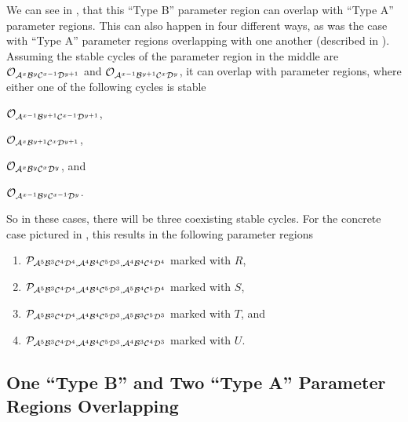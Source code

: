 We can see in , that this ``Type B'' parameter region can overlap with ``Type A'' parameter regions.
This can also happen in four different ways, as was the case with ``Type A'' parameter regions overlapping with one another (described in ).
Assuming the stable cycles of the parameter region in the middle are $\Cycle{\A^x\B^y\C^{x-1}\D^{y+1}}$ and $\Cycle{\A^{x-1}\B^{y+1}\C^x\D^y}$, it can overlap with parameter regions, where either one of the following cycles is stable
\begin{enumerate*}
    \item $\Cycle{\A^{x-1}\B^{y+1}\C^{x-1}\D^{y+1}}$,
    \item $\Cycle{\A^x\B^{y+1}\C^x\D^{y+1}}$,
    \item $\Cycle{\A^x\B^y\C^x\D^y}$, and
    \item $\Cycle{\A^{x-1}\B^y\C^{x-1}\D^y}$.
\end{enumerate*}
So in these cases, there will be three coexisting stable cycles.
For the concrete case pictured in , this results in the following parameter regions
\begin{enumerate}
    \item $\P_{\A^5\B^3\C^4\D^4, \A^4\B^4\C^5\D^3, \A^4\B^4\C^4\D^4}$ marked with $R$,
    \item $\P_{\A^5\B^3\C^4\D^4, \A^4\B^4\C^5\D^3, \A^5\B^4\C^5\D^4}$ marked with $S$,
    \item $\P_{\A^5\B^3\C^4\D^4, \A^4\B^4\C^5\D^3, \A^5\B^3\C^5\D^3}$ marked with $T$, and
    \item $\P_{\A^5\B^3\C^4\D^4, \A^4\B^4\C^5\D^3, \A^4\B^3\C^4\D^3}$ marked with $U$.
\end{enumerate}

\subsection{One ``Type B'' and Two ``Type A'' Parameter Regions Overlapping}

